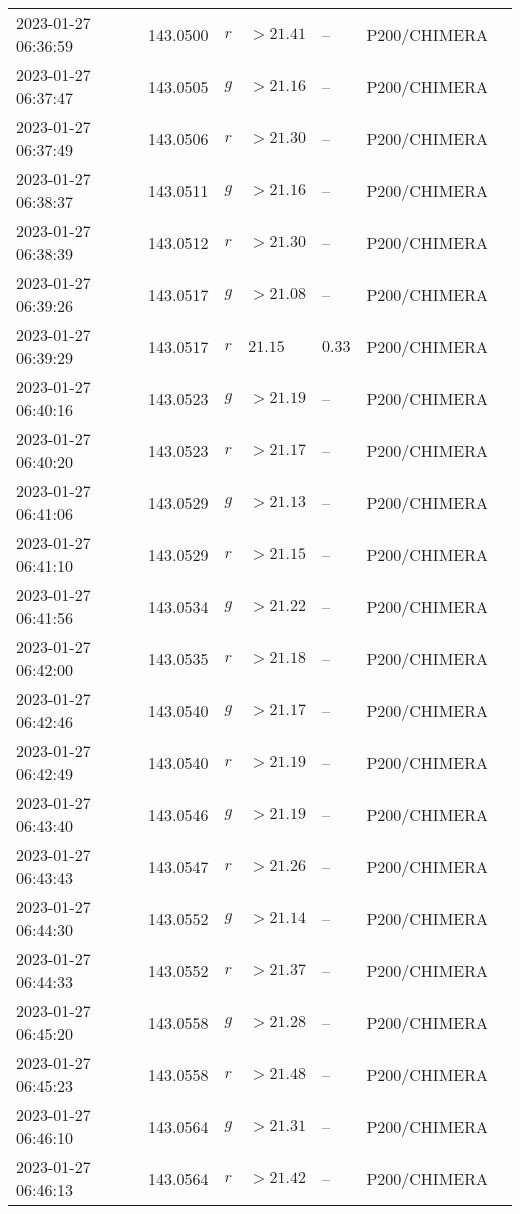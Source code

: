 \documentclass{nature_plusfigure}
\begin{document}
\begin{supplement}
\begin{center}
\begin{longtable}{lllllll}
2023-01-27 06:36:59 & 143.0500 & $r$ & $>21.41$ & -- & P200/CHIMERA &  \\ 
2023-01-27 06:37:47 & 143.0505 & $g$ & $>21.16$ & -- & P200/CHIMERA &  \\ 
2023-01-27 06:37:49 & 143.0506 & $r$ & $>21.30$ & -- & P200/CHIMERA &  \\ 
2023-01-27 06:38:37 & 143.0511 & $g$ & $>21.16$ & -- & P200/CHIMERA &  \\ 
2023-01-27 06:38:39 & 143.0512 & $r$ & $>21.30$ & -- & P200/CHIMERA &  \\ 
2023-01-27 06:39:26 & 143.0517 & $g$ & $>21.08$ & -- & P200/CHIMERA &  \\ 
2023-01-27 06:39:29 & 143.0517 & $r$ & $21.15$ & $0.33$ & P200/CHIMERA &  \\ 
2023-01-27 06:40:16 & 143.0523 & $g$ & $>21.19$ & -- & P200/CHIMERA &  \\ 
2023-01-27 06:40:20 & 143.0523 & $r$ & $>21.17$ & -- & P200/CHIMERA &  \\ 
2023-01-27 06:41:06 & 143.0529 & $g$ & $>21.13$ & -- & P200/CHIMERA &  \\ 
2023-01-27 06:41:10 & 143.0529 & $r$ & $>21.15$ & -- & P200/CHIMERA &  \\ 
2023-01-27 06:41:56 & 143.0534 & $g$ & $>21.22$ & -- & P200/CHIMERA &  \\ 
2023-01-27 06:42:00 & 143.0535 & $r$ & $>21.18$ & -- & P200/CHIMERA &  \\ 
2023-01-27 06:42:46 & 143.0540 & $g$ & $>21.17$ & -- & P200/CHIMERA &  \\ 
2023-01-27 06:42:49 & 143.0540 & $r$ & $>21.19$ & -- & P200/CHIMERA &  \\ 
2023-01-27 06:43:40 & 143.0546 & $g$ & $>21.19$ & -- & P200/CHIMERA &  \\ 
2023-01-27 06:43:43 & 143.0547 & $r$ & $>21.26$ & -- & P200/CHIMERA &  \\ 
2023-01-27 06:44:30 & 143.0552 & $g$ & $>21.14$ & -- & P200/CHIMERA &  \\ 
2023-01-27 06:44:33 & 143.0552 & $r$ & $>21.37$ & -- & P200/CHIMERA &  \\ 
2023-01-27 06:45:20 & 143.0558 & $g$ & $>21.28$ & -- & P200/CHIMERA &  \\ 
2023-01-27 06:45:23 & 143.0558 & $r$ & $>21.48$ & -- & P200/CHIMERA &  \\ 
2023-01-27 06:46:10 & 143.0564 & $g$ & $>21.31$ & -- & P200/CHIMERA &  \\ 
2023-01-27 06:46:13 & 143.0564 & $r$ & $>21.42$ & -- & P200/CHIMERA &  \\ 

\end{longtable}
\end{center}
\end{supplement}
\end{document}
